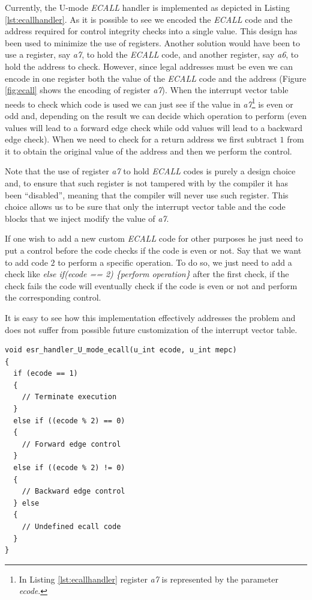 Currently, the U-mode \textit{ECALL} handler is implemented as depicted in
Listing \ref{lst:ecallhandler}. As it is possible to see we encoded the \textit{ECALL}
code and the address required for control integrity checks into a single value. This
design has been used to minimize the use of registers. Another solution would
have been to use a register, say \textit{a7}, to hold the \textit{ECALL} code, and
another register, say \textit{a6}, to hold the address to check. However, since
legal addresses must be even we can encode in one register both the value of the
\textit{ECALL} code and the address (Figure \ref{fig:ecall} shows the encoding
of register \textit{a7}). When the interrupt vector table needs to check which code
is used we can just see if the value in \textit{a7}\footnote{In Listing
\ref{lst:ecallhandler} register \textit{a7} is represented by the parameter \textit{ecode}.}
is even or odd and, depending on the result we can decide which operation to
perform (even values will lead to a forward edge check while odd values will lead
to a backward edge check). When we need to check for a return address we first subtract
$1$ from it to obtain the original value of the address and then we perform the control.

Note that the use of register \textit{a7} to hold \textit{ECALL} codes is purely
a design choice and, to ensure that such register is not tampered with by the
compiler it has been ``disabled'', meaning that the compiler will never use such
register. This choice allows us to be sure that only the interrupt vector table
and the code blocks that we inject modify the value of \textit{a7}.

If one wish to add a new custom \textit{ECALL} code for other purposes he just
need to put a control before the code checks if the code is even or not. Say that
we want to add code $2$ to perform a specific operation. To do so, we just need to
add a check like \textit{else if(ecode == 2) \{perform operation\}} after the
first check, if the check fails the code will eventually check if the code is even
or not and perform the corresponding control.

It is easy to see how this implementation effectively addresses the problem and does
not suffer from possible future customization of the interrupt vector table.

\begin{lstlisting}[style=CStyle, caption = U-mode \textit{ECALL} handler, label={lst:ecallhandler}]
void esr_handler_U_mode_ecall(u_int ecode, u_int mepc)
{
  if (ecode == 1)
  {
    // Terminate execution
  }
  else if ((ecode % 2) == 0)
  {
    // Forward edge control
  }
  else if ((ecode % 2) != 0)
  {
    // Backward edge control
  } else
  {
    // Undefined ecall code
  }
}
\end{lstlisting}

